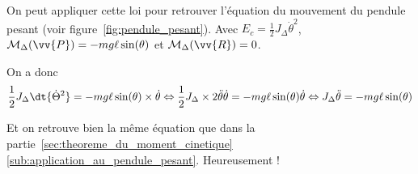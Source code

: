 \documentclass{cours}
\begin{document}
On peut appliquer cette loi pour retrouver l'équation du mouvement du pendule pesant (voir figure~\ref{fig:pendule_pesant}). Avec $E_c = \frac{1}{2}J_\Delta \dot{\theta}^2$, $\M_\Delta(\vv{P}) = -mg\ell\sin(\theta)$ et $\M_\Delta(\vv{R})=0$.   

On a donc
\begin{equation}
\frac{1}{2}J_\Delta  \dt{\dot{\Theta}^2} = -mg\ell\sin(\theta)\times \dot{\theta} \Leftrightarrow \frac{1}{2}J_\Delta \times 2 \ddot{\theta} \dot{\theta} = -mg\ell\sin(\theta)\dot{\theta} \Leftrightarrow J_\Delta \ddot{\theta} = -mg\ell\sin(\theta)
\end{equation}

Et on retrouve bien la même équation que dans la partie~\ref{sec:theoreme_du_moment_cinetique}\ref{sub:application_au_pendule_pesant}. Heureusement !
\end{document}
